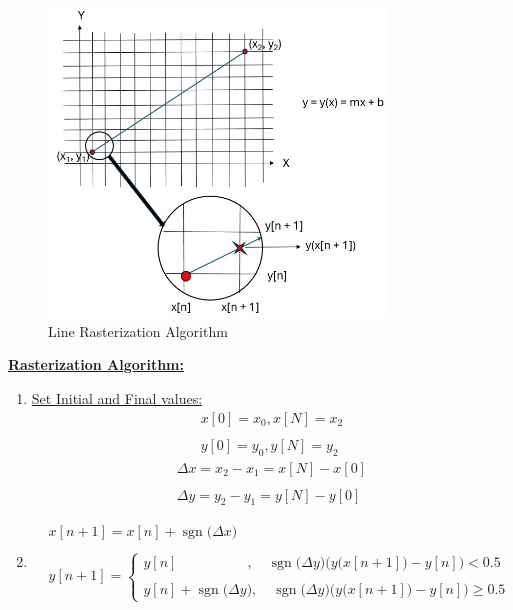 \documentclass{article}
\DeclareMathOperator{\sgn}{sgn}
\begin{document}
\begin{figure}[ht!]
\centering
\includegraphics[width=90mm]{Line Rasterization.jpg}
\caption{Line Rasterization Algorithm \label{overflow}}
\end{figure}

\underline{\textbf{Rasterization Algorithm:}} \\
\begin{enumerate}
    \item \underline{Set Initial and Final values:}
           \begin{align*}
                x[0] = x_{0}, x[N] = x_{2} \\ \\
                y[0] = y_{0}, y[N] = y_{2}
             \end{align*}
           \begin{align*}     
                \Delta x = x_{2} - x_{1} = x[N] - x[0] \\ \\
                \Delta y = y_{2} - y_{1} = y[N] - y[0] 
             \end{align*}
    \item {} 
           \begin{align*}
                &x[n + 1] = x[n] + \sgn\big(\Delta x\big) \\ \\ 
                &y[n + 1] = \begin{cases}
                                y[n] \quad \quad \quad \quad \quad, \quad \sgn\big(\Delta y\big)\Big(y\big(x[n + 1]\big) - y[n]\Big) < 0.5 \\ \\
                                y[n] + \sgn\big(\Delta y\big), \quad \sgn\big(\Delta y\big)\Big(y\big(x[n + 1]\big) - y[n]\Big) \geq 0.5 
                              \end{cases} 
            \end{align*}
\end{enumerate}
\end{document}
